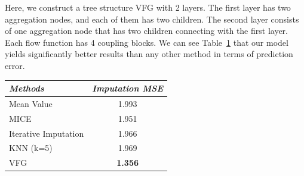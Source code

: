 \documentclass[sigconf, anonymous, review]{acmart}
\theoremstyle{plain}
\theoremstyle{definition}
\theoremstyle{remark}
\begin{document}
Here, we construct a tree structure VFG with 2 layers. 
The first layer has two aggregation nodes, and each of them has two children. 
The second layer consists of one aggregation node that has two children connecting with the first layer.  
Each flow function has 4 coupling blocks. 
We can see Table~\ref{tab:imp_arrhytmia} that our model yields significantly better results than any other method in terms of prediction error. 
{\small
\begin{table}[ht]
\centering
 \begin{tabular}{l | c  }\hline
\textit{Methods} & \textit{Imputation MSE}  \\
\hline
Mean Value &1.993 \\
MICE & 1.951\\
Iterative Imputation & 1.966\\
KNN (k=5) &1.969 \\
\hline
VFG & \textbf{1.356} \\  
\hline
\end{tabular}
 \label{tab:imp_arrhytmia}\vspace{-0.1in}
\end{table}}







\end{document}
